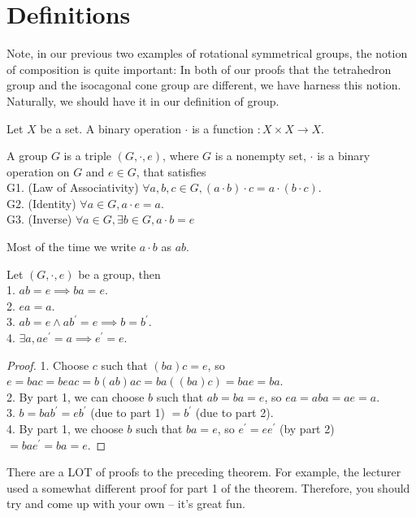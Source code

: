\section{Definitions}
Note, in our previous two examples of rotational symmetrical groups, the notion of composition is quite important:
In both of our proofs that the tetrahedron group and the isocagonal cone group are different, we have harness this notion.
Naturally, we should have it in our definition of group.
\begin{definition}
    Let $X$ be a set. A binary operation $\cdot$ is a function $:X\times X\to X$.
\end{definition}
\begin{definition}
    A group $G$ is a triple $(G,\cdot,e)$, where $G$ is a nonempty set, $\cdot$ is a binary operation on $G$ and $e\in G$, that satisfies\\
    G1. (Law of Associativity) $\forall a,b,c\in G, (a\cdot b)\cdot c=a\cdot (b\cdot c)$.\\
    G2. (Identity) $\forall a\in G, a\cdot e=a$.\\
    G3. (Inverse) $\forall a\in G, \exists b\in G, a\cdot b=e$
\end{definition}
Most of the time we write $a\cdot b$ as $ab$.
\begin{theorem}
    Let $(G, \cdot, e)$ be a group, then\\
    1. $ab=e\implies ba=e$.\\
    2. $ea=a$.\\
    3. $ab=e\land ab^\prime=e\implies b=b^\prime$.\\
    4. $\exists a, ae^\prime=a\implies e^\prime=e$.
\end{theorem}
\begin{proof}
    1. Choose $c$ such that $(ba)c=e$, so $e=bac=beac=b(ab)ac=ba((ba)c)=bae=ba$.\\
    2. By part 1, we can choose $b$ such that $ab=ba=e$, so $ea=aba=ae=a$.\\
    3. $b=bab^\prime=eb^\prime$ (due to part 1) $=b^\prime$ (due to part 2).\\
    4. By part 1, we choose $b$ such that $ba=e$, so $e^\prime=ee^\prime$ (by part 2) $=bae^\prime=ba=e$.
\end{proof}
\begin{remark}
    There are a LOT of proofs to the preceding theorem.
    For example, the lecturer used a somewhat different proof for part 1 of the theorem.
    Therefore, you should try and come up with your own -- it's great fun.
\end{remark}
